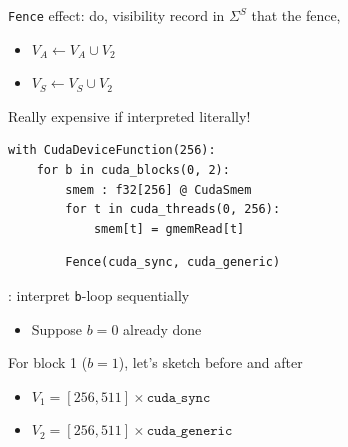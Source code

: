 \begin{minipage}[t]{0.42\textwidth}\fixminipage
\vspace{-6mm}

\texttt{Fence} effect: do,  visibility record in $\Sigma^S$ that  the fence,
\begin{itemize}
  \item $V_A \leftarrow V_A \cup V_2$
  \item $V_S \leftarrow V_S \cup V_2$
\end{itemize}
Really expensive if interpreted literally!



\begin{verbatim}
with CudaDeviceFunction(256):
    for b in cuda_blocks(0, 2):
        smem : f32[256] @ CudaSmem
        for t in cuda_threads(0, 256):
            smem[t] = gmemRead[t]
\end{verbatim}
\begin{mdframed}[style=MyFrame, backgroundcolor=violetBoxBg]
\color{violetBoxFg}
\begin{verbatim}
        Fence(cuda_sync, cuda_generic)
\end{verbatim}
\end{mdframed}

: interpret \texttt{b}-loop sequentially
\begin{itemize}
  \item Suppose $b=0$ already done
\end{itemize}

For block 1 ($b = 1$), let's sketch before and after
\begin{itemize}
  \item $V_1 = [256, 511] \times \texttt{cuda\_sync}$
  \item $V_2 = [256, 511] \times \texttt{cuda\_generic}$
\end{itemize}
\end{minipage}
\hfill
